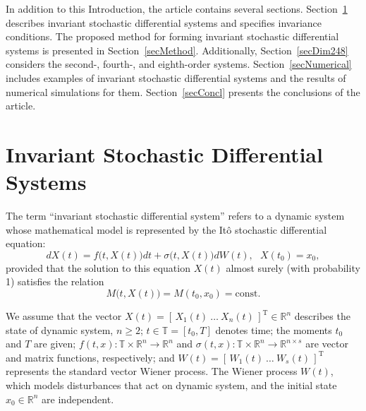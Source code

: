\documentclass[10pt,reqno]{amsart}
\newcommand{\trans}{{\scriptscriptstyle \mathrm{T}}}
\theoremstyle{plain}
\theoremstyle{remark}
\begin{document}
In addition to this Introduction, the article contains several sections. Section~\ref{secInvariant} describes invariant stochastic differential systems and specifies invariance conditions. The proposed method for forming invariant stochastic differential systems is presented in Section~\ref{secMethod}. Additionally, Section~\ref{secDim248} considers the second-, fourth-, and eighth-order systems. Section~\ref{secNumerical} includes examples of invariant stochastic differential systems and the results of numerical simulations for them. Section~\ref{secConcl} presents the conclusions of the article.



\section{Invariant Stochastic Differential Systems}\label{secInvariant}

The term ``invariant stochastic differential system'' refers to a dynamic system whose mathematical model is represented by the It\^o stochastic differential equation:
\begin{equation}\label{eqIto}
  dX(t) = f \bigl( t,X(t) \bigr) dt + \sigma \bigl( t,X(t) \bigr) dW(t), \ \ \ X(t_0) = x_0,
\end{equation}
provided that the solution to this equation $X(t)$ almost surely (with probability 1) satisfies the relation
\begin{equation}\label{eqInvariant}
  M \bigl(t,X(t) \bigr) = M(t_0,x_0) = \mathrm{const}.
\end{equation}

We assume that the vector $X(t) = [ \, X_1(t) ~ \dots ~ X_n(t) \, ]^\trans \in \mathds{R}^n$ describes the state of dynamic system, $n \geqslant 2$; $t \in \mathds{T} = [t_0,T]$ denotes time; the moments $t_0$ and $T$ are given; $f(t,x) \colon \mathds{T} \times \mathds{R}^n \to \mathds{R}^n$ and $\sigma(t,x) \colon \mathds{T} \times \mathds{R}^n \to \mathds{R}^{n \times s}$ are vector and matrix functions, respectively; and $W(t) = [ \, W_1(t) ~ \dots ~ W_s(t) \, ]^\trans$ represents the standard vector Wiener process. The Wiener process $W(t)$, which models disturbances that act on dynamic system, and the initial state $x_0 \in \mathds{R}^n$ are independent.
\end{document}
